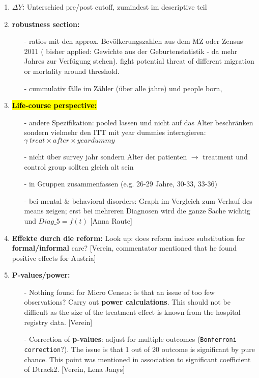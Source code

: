 \documentclass[11pt,a4paper]{article}
\begin{document}
{\begin{enumerate}
\item \textbf{$\Delta Y$:}\newline
Unterschied pre/post cutoff, zumindest im descriptive teil


\item \textbf{robustness section:}\vspace{-1em}
\begin{itemize}
	\item[-] ratios mit den approx. Bevölkerungszahlen aus dem MZ oder Zensus 2011 ( bisher applied: Gewichte aus der Geburtenstatistik - da mehr Jahres zur Verfügung stehen). fight potential threat of different migration or mortality around threshold.
	\item[-] cummulativ fälle im Zähler (über alle jahre) und people born, 
\end{itemize}


\item \textbf{\hl{Life-course perspective:}}\vspace{-1em}
\begin{itemize}
	\item[-]andere Spezifikation: pooled lassen und nicht auf das Alter beschränken sondern 	vielmehr den ITT mit year dummies interagieren: \newline
	$\gamma\  treat \times after \times yeardummy$
	\item[-] nicht über survey jahr sondern Alter der patienten $\rightarrow$ treatment und control 	group sollten gleich alt sein
	\item[-] in Gruppen zusammenfassen (e.g. 26-29 Jahre, 30-33, 33-36)
	\item[-] bei mental \& behavioral disorders: Graph im Vergleich zum Verlauf des means zeigen; 	erst bei mehreren Diagnosen wird die ganze Sache wichtig und $Diag\_5 = f(t)$ [Anna Raute]
\end{itemize}


\item \textbf{Effekte durch die reform:}\newline
Look up: does reform induce substitution for \textbf{formal/informal} care? [Verein, commentator mentioned that he found positive effects for Austria] 


\item \textbf{P-values/power:}\vspace{-1em}
\begin{itemize}
	\item[-] Nothing found for Micro Census: is that an issue of too few observations? Carry out \textbf{power calculations}. This should not be difficult as the size of the treatment effect is known from the hospital registry data. [Verein]
	\item[-] Correction of \textbf{p-values}: adjust for multiple outcomes (\texttt{Bonferroni correction}?). The issue is that 1 out of 20 outcome is significant by pure chance. This point was mentioned in association to significant coefficient of Dtrack2. [Verein, Lena Janys]
\end{itemize}



\end{enumerate}}
\end{document}
